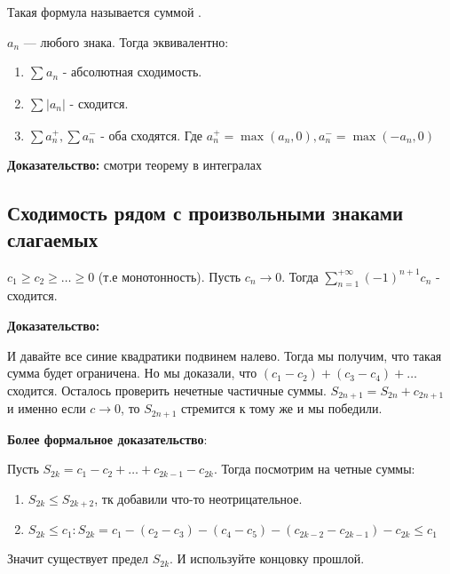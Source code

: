 
Такая формула называется суммой . %


$a_n$ --- любого знака. Тогда эквивалентно:
\begin{enumerate}
    \item $\sum\limits_{}a_n$ - абсолютная сходимость.
    \item $\sum\limits_{}|a_n|$ - сходится.
    \item $\sum a_n^+, \sum a_n^-$ - оба сходятся. Где $a_n^+ = \max(a_n,0), a^-_n= \max(-a_n,0)$
\end{enumerate}

\textbf{Доказательство:} смотри теорему в интегралах

\pagebreak
\subsection{Сходимость рядом с произвольными знаками слагаемых}


$c_1 \geq c_2 \geq \ldots \geq 0$ (т.е монотонность). Пусть $c_n \rightarrow 0 $. Тогда $\sum\limits_{n=1}^{+\infty} (-1)^{n+1} c_n$ - сходится.

\textbf{Доказательство:}


И давайте все синие квадратики подвинем налево. Тогда мы получим, что такая сумма будет ограничена. Но мы доказали, что $(c_1-c_2) +(c_3-c_4) + \ldots$  сходится.  Осталось проверить нечетные частичные суммы. $S_{2n+1} =S_{2n}+ c_{2n+1}$ и именно если $c\rightarrow 0 $, то $S_{2n+1}$ стремится к тому же и мы победили.

\textbf{Более формальное доказательство}:

Пусть $S_{2k}  = c_1-c_2 + \ldots +c_{2k-1} - c_{2k}$. Тогда посмотрим на четные суммы:

\begin{enumerate}
    \item $S_{2k}\leq S_{2k+2}$, тк добавили что-то неотрицательное.
    \item $S_{2k}\leq c_1: S_{2k} = c_1-(c_2-c_3)-(c_4-c_5) - (c_{2k-2}-c_{2k-1})-c_{2k}\leq c_1$
\end{enumerate}

Значит существует предел $S_{2k}$. И используйте концовку прошлой.


